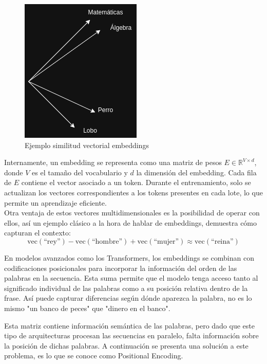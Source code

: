 \documentclass[11pt]{book}
\begin{document}
\begin{figure}[h]
    \centering
    \includegraphics[width=0.5\linewidth]{img/ejemplo_embedding.png}
    \caption{Ejemplo similitud vectorial embeddings}
    \label{fig:placeholder6}
\end{figure}

Internamente, un embedding se representa como una matriz de pesos $E \in \mathbb{R}^{V \times d}$, donde $V$ es el tamaño del vocabulario y $d$ la dimensión del embedding. Cada fila de $E$ contiene el vector asociado a un token. Durante el entrenamiento, solo se actualizan los vectores correspondientes a los tokens presentes en cada lote, lo que permite un aprendizaje eficiente.\\

Otra ventaja de estos vectores multidimensionales es la posibilidad de operar con ellos, así un ejemplo clásico a la hora de hablar de embeddings, demuestra cómo capturan el contexto: 
\[
\text{vec}(\text{``rey''}) - \text{vec}(\text{``hombre''}) + \text{vec}(\text{``mujer''}) \approx \text{vec}(\text{``reina''})
\]

En modelos avanzados como los Transformers, los embeddings se combinan con codificaciones posicionales para incorporar la información del orden de las palabras en la secuencia. Esta suma permite que el modelo tenga acceso tanto al significado individual de las palabras como a su posición relativa dentro de la frase. Así puede capturar diferencias según dónde aparezca la palabra, no es lo mismo "un banco de peces" que "dinero en el banco".\parencite{perez_embeddings}

Esta matriz contiene información semántica de las palabras, pero dado que este tipo de arquitecturas procesan las secuencias en paralelo,  falta información sobre la posición de dichas palabras. A continuación se presenta una solución a este problema, es lo que se conoce como Positional Encoding. 
\end{document}
